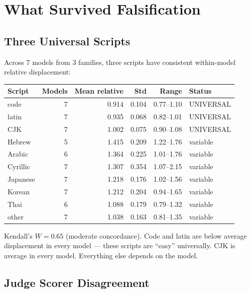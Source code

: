 \documentclass[11pt,a4paper]{article}
\begin{document}
\section{What Survived Falsification}

\subsection{Three Universal Scripts}

Across 7 models from 3 families, three scripts have consistent within-model relative displacement:

\begin{center}
\begin{tabular}{lrrrrl}
\toprule
\textbf{Script} & \textbf{Models} & \textbf{Mean relative} & \textbf{Std} & \textbf{Range} & \textbf{Status} \\
\midrule
code & 7 & 0.914 & 0.104 & 0.77--1.10 & UNIVERSAL \\
latin & 7 & 0.935 & 0.068 & 0.82--1.01 & UNIVERSAL \\
CJK & 7 & 1.002 & 0.075 & 0.90--1.08 & UNIVERSAL \\
\midrule
Hebrew & 5 & 1.415 & 0.209 & 1.22--1.76 & variable \\
Arabic & 6 & 1.364 & 0.225 & 1.01--1.76 & variable \\
Cyrillic & 7 & 1.307 & 0.354 & 1.07--2.15 & variable \\
Japanese & 7 & 1.218 & 0.176 & 1.02--1.56 & variable \\
Korean & 7 & 1.212 & 0.204 & 0.94--1.65 & variable \\
Thai & 6 & 1.088 & 0.179 & 0.79--1.32 & variable \\
other & 7 & 1.038 & 0.163 & 0.81--1.35 & variable \\
\bottomrule
\end{tabular}
\end{center}

Kendall's $W = 0.65$ (moderate concordance). Code and latin are below average displacement in every model --- these scripts are ``easy'' universally. CJK is average in every model. Everything else depends on the model.

\subsection{Judge Scorer Disagreement}
\end{document}
